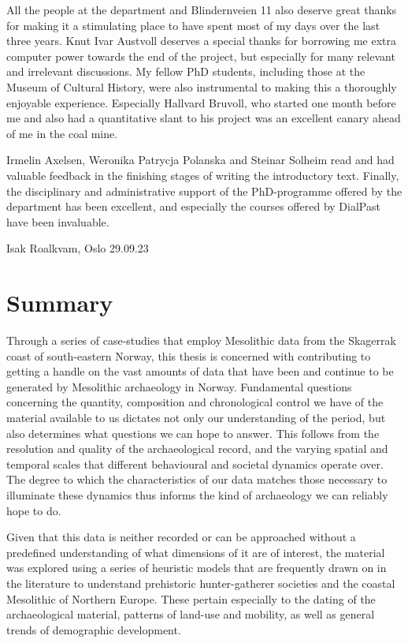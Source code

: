 All the people at the department and Blindernveien 11 also deserve great thanks for making it a stimulating place to have spent most of my days over the last three years. Knut Ivar Austvoll deserves a special thanks for borrowing me extra computer power towards the end of the project, but especially for many relevant and irrelevant discussions. My fellow PhD students, including those at the Museum of Cultural History, were also instrumental to making this a thoroughly enjoyable experience. Especially Hallvard Bruvoll, who started one month before me and also had a quantitative slant to his project was an excellent canary ahead of me in the coal mine.

Irmelin Axelsen, Weronika Patrycja Polanska and Steinar Solheim read and had valuable feedback in the finishing stages of writing the introductory text. Finally, the disciplinary and administrative support of the PhD-programme offered by the department has been excellent, and especially the courses offered by DialPast have been invaluable.


Isak Roalkvam, Oslo 29.09.23
\newpage

\section*{Summary}
Through a series of case-studies that employ Mesolithic data from the Skagerrak coast of south-eastern Norway, this thesis is concerned with contributing to getting a handle on the vast amounts of data that have been and continue to be generated by Mesolithic archaeology in Norway. Fundamental questions concerning the quantity, composition and chronological control we have of the material available to us dictates not only our understanding of the period, but also determines what questions we can hope to answer. This follows from the resolution and quality of the archaeological record, and the varying spatial and temporal scales that different behavioural and societal dynamics operate over. The degree to which the characteristics of our data matches those necessary to illuminate these dynamics thus informs the kind of archaeology we can reliably hope to do.   

Given that this data is neither recorded or can be approached without a predefined understanding of what dimensions of it are of interest, the material was explored using a series of heuristic models that are frequently drawn on in the literature to understand prehistoric hunter-gatherer societies and the coastal Mesolithic of Northern Europe. These pertain especially to the dating of the archaeological material, patterns of land-use and mobility, as well as general trends of demographic development. 

